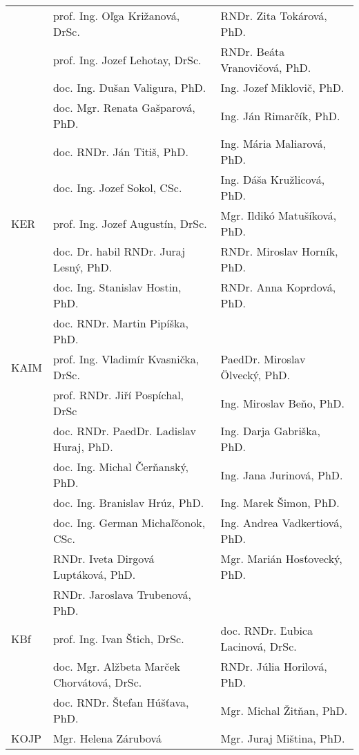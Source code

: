 \begin{table}
\begin{tabularx}{\textwidth}{lll}
         & prof. Ing. Oľga Križanová, DrSc.           & RNDr. Zita Tokárová, PhD.         \\
         & prof. Ing. Jozef Lehotay, DrSc.            & RNDr. Beáta Vranovičová, PhD.     \\
         & doc. Ing. Dušan Valigura, PhD.             & Ing. Jozef Miklovič, PhD.         \\
         & doc. Mgr. Renata Gašparová, PhD.           & Ing. Ján Rimarčík, PhD.           \\
         & doc. RNDr. Ján Titiš, PhD.                 & Ing. Mária Maliarová, PhD.        \\
         & doc. Ing. Jozef Sokol, CSc.                & Ing. Dáša Kružlicová, PhD.        \\[2ex]
    KER  & prof. Ing. Jozef Augustín, DrSc.           & Mgr. Ildikó Matušíková, PhD.      \\
         & doc. Dr. habil RNDr. Juraj Lesný, PhD.     & RNDr. Miroslav Horník, PhD.       \\
         & doc. Ing. Stanislav Hostin, PhD.           & RNDr. Anna Koprdová, PhD.         \\
         & doc. RNDr. Martin Pipíška, PhD.            &                                   \\[2ex]
    KAIM & prof. Ing. Vladimír Kvasnička, DrSc.       & PaedDr. Miroslav Ölvecký, PhD.    \\
         & prof. RNDr. Jiří Pospíchal, DrSc           & Ing. Miroslav Beňo, PhD.          \\
         & doc. RNDr. PaedDr. Ladislav Huraj, PhD.    & Ing. Darja Gabriška, PhD.         \\
         & doc. Ing. Michal Čerňanský, PhD.           & Ing. Jana Jurinová, PhD.          \\
         & doc. Ing. Branislav Hrúz, PhD.             & Ing. Marek Šimon, PhD.            \\
         & doc. Ing. German Michaľčonok, CSc.         & Ing. Andrea Vadkertiová, PhD.     \\
         & RNDr. Iveta Dirgová Luptáková, PhD.        & Mgr. Marián Hosťovecký, PhD.      \\
         & RNDr. Jaroslava Trubenová, PhD.            &                                   \\[2ex]
    KBf  & prof. Ing. Ivan Štich, DrSc.               & doc. RNDr. Ľubica Lacinová, DrSc. \\
         & doc. Mgr. Alžbeta Marček Chorvátová, DrSc. & RNDr. Júlia Horilová, PhD.        \\
         & doc. RNDr. Štefan Húšťava, PhD.            & Mgr. Michal Žitňan, PhD.          \\[2ex]
    KOJP & Mgr. Helena Zárubová                       & Mgr. Juraj Miština, PhD.          \\
    \bottomrule
  \end{tabularx}
\end{table}

